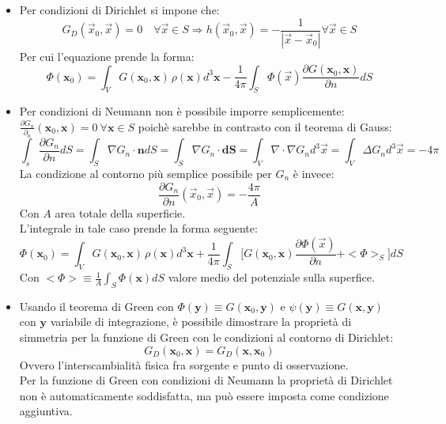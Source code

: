 \documentclass[twoside]{article}
\renewcommand{\vec}[1]{\textbf{#1}}
\begin{document}
\begin{itemize}
    \item Per condizioni di Dirichlet si impone che:
    \begin{equation}
        G_D(\Vec{x}_0,\Vec{x})=0 \quad\forall \Vec{x}\in S \Longrightarrow h(\Vec{x}_0,\Vec{x})=-\frac{1}{|\Vec{x}-\Vec{x}_0|} \forall \Vec{x}\in S
    \end{equation}
    Per cui l'equazione prende la forma:
    \begin{equation}
    \Phi(\vec{x}_0)=\int_VG(\vec{x}_0,\vec{x})\frac{}{}\rho(\vec{x})d^3\vec{x}-\frac{1}{4\pi}\int_S\Phi(\Vec{x})\frac{\partial G(\vec{x}_0,\vec{x})}{\partial n} dS
\end{equation}
\item Per condizioni di Neumann non è possibile imporre semplicemente: $\frac{\partial G_n}{\partial_n}(\vec{x}_0,\vec{x})=0 \ \forall\vec{x}\in S$ poichè sarebbe in contrasto con il teorema di Gauss:
\begin{equation}
    \int_s\frac{\partial G_n}{\partial n} dS=\int_S\nabla G_n\cdot \vec{n}dS=\int_S\nabla G_n\cdot \vec{dS}=\int_V\nabla\cdot\nabla G_nd^3\Vec{x}=\int_V\Delta G_nd^3\Vec{x}=-4\pi
\end{equation}
La condizione al contorno più semplice possibile per $G_n$ è invece:
\begin{equation}
    \frac{\partial G_n}{\partial n}(\Vec{x}_0,\Vec{x})=-\frac{4\pi}{A}
\end{equation}
Con $A$ area totale della superficie.\\
L'integrale in tale caso prende la forma seguente:
\begin{equation}
    \Phi(\vec{x}_0)=\int_VG(\vec{x}_0,\vec{x})\frac{}{}\rho(\vec{x})d^3\vec{x}+\frac{1}{4\pi}\int_S\biggl[G(\vec{x}_0,\vec{x})\frac{\partial \Phi(\Vec{x})}{\partial n}+<\Phi>_S\biggr]dS
\end{equation}
Con $<\Phi>\equiv \frac{1}{A}\int_S\Phi(\vec{x})dS$ valore medio del potenziale sulla superfice.\\
\item Usando il teorema di Green con $\Phi(\vec{y})\equiv G(\vec{x}_0,\vec{y})$ e $\psi(\vec{y})\equiv G(\vec{x},\vec{y})$ con $\vec{y}$ variabile di integrazione, è possibile dimostrare la proprietà di simmetria per la funzione di Green con le condizioni al contorno di Dirichlet:
\begin{equation}
    G_D(\vec{x}_0,\vec{x})=G_D(\vec{x},\vec{x}_0)
\end{equation}
Ovvero l'interscambialità fisica fra sorgente e punto di osservazione.\\
Per la funzione di Green con condizioni di Neumann la proprietà di Dirichlet non è automaticamente soddisfatta, ma può essere imposta come condizione aggiuntiva.\\
\end{itemize}
\end{document}
